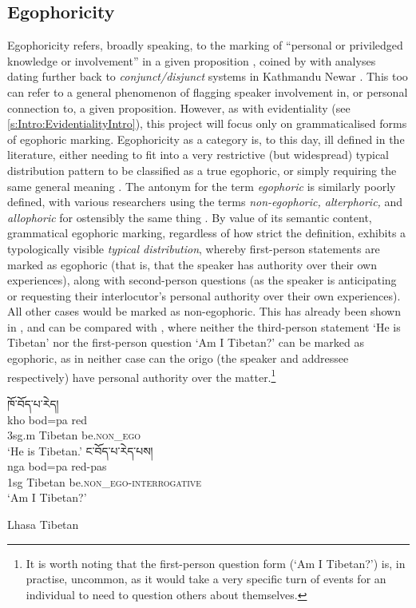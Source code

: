 \subsection{Egophoricity}\label{s:Intro:EgophoricityIntro}
Egophoricity refers, broadly speaking, to the marking of ``personal or priviledged knowledge or involvement'' in a given proposition \cite[2]{EgoIntro}, coined by  with analyses dating further back to \textit{conjunct/disjunct} systems in Kathmandu Newar \cite[Newaric: Nepal, ][]{HaleNewar1980}. This too can refer to a general phenomenon of flagging speaker involvement in, or personal connection to, a given proposition. However, as with evidentiality (see \ref{s:Intro:EvidentialityIntro}), this project will focus only on grammaticalised forms of egophoric marking. Egophoricity as a category is, to this day, ill defined in the literature, either needing to fit into a very restrictive (but widespread) typical distribution pattern to be classified as a true egophoric, or simply requiring the same general meaning \cites{EgoIntro}{Gawne2017}. The antonym for the term \textit{egophoric} is similarly poorly defined, with various researchers using the terms \textit{non-egophoric, alterphoric,} and \textit{allophoric} for ostensibly the same thing \cite{Widmer2020}. By value of its semantic content, grammatical egophoric marking, regardless of how strict the definition, exhibits a typologically visible \textit{typical distribution}, whereby first-person statements are marked as egophoric (that is, that the speaker has authority over their own experiences), along with second-person questions (as the speaker is anticipating or requesting their interlocutor's personal authority over their own experiences). All other cases would be marked as non-egophoric. This has already been shown in , and can be compared with , where neither the third-person statement `He is Tibetan' nor the first-person question `Am I Tibetan?' can be marked as egophoric, as in neither case can the origo (the speaker and addressee respectively) have personal authority over the matter.\footnote{It is worth noting that the first-person question form (`Am I Tibetan?') is, in practise, uncommon, as it would take a very specific turn of events for an individual to need to question others about themselves.}

\begin{exe}
\ex\label{ex:EgoDistribution}
\begin{xlist}
\ex 
\glll \texttibetan{ཁོ་བོད་པ་རེད།} \\
kho bod=pa red \\
3sg.m Tibetan be.\textsc{non\_ego} \\
\glt `He is Tibetan.'
\ex 
\glll \texttibetan{ང་བོད་པ་རེད་པས།} \\
nga bod=pa red-pas \\
1sg Tibetan be.\textsc{non\_ego}-\textsc{interrogative} \\
\glt `Am I Tibetan?'
\end{xlist}
Lhasa Tibetan \cite[Tibetic: PRC,][394]{DeLancey2017Tibetan}
\end{exe}

